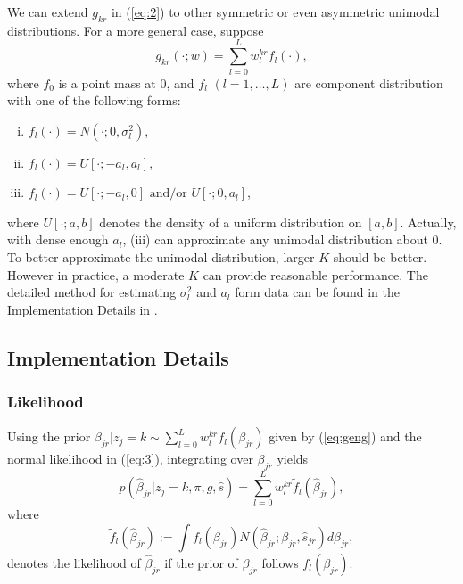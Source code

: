 \documentclass[12pt]{article}
\begin{document}
\vspace{4mm} We can extend $g_{kr}$ in (\ref{eq:2}) to other symmetric or even asymmetric unimodal distributions. For a more general case, suppose
\begin{equation}
g_{kr}(\cdot;w) = \sum_{l=0}^L w_l^{kr}f_l(\cdot),
\label{eq:geng}
\end{equation}
where $f_0$ is a point mass at 0, and $f_l$ $(l=1,\ldots,L)$ are component distribution with one of the following forms:
\begin{enumerate}[(i)]
\item $f_l(\cdot) = N(\cdot; 0, \sigma^2_l)$,
\item $f_l(\cdot) = U[\cdot; -a_l,a_l]$,
\item $f_l(\cdot) = U[\cdot; -a_l,0] \text{ and/or } U[\cdot; 0,a_l]$,
\end{enumerate}
where $U[\cdot; a,b]$ denotes the density of a uniform distribution on $[a,b]$. Actually, with dense enough $a_l$, (iii) can approximate any unimodal distribution about 0. To better approximate the unimodal distribution, larger $K$ should be better. However in practice, a moderate $K$ can provide reasonable performance. The detailed method for estimating $\sigma_l^2$ and $a_l$ form data can be found in the Implementation Details in \cite{Stephens2017}. 

\vspace{5mm}
\subsection{Implementation Details} \label{sec:detail}

\vspace{5mm}
\subsubsection{Likelihood}

\vspace{4mm} Using the prior $\beta_{jr}|z_j=k \sim \sum_{l=0}^L w_l^{kr}f_l(\beta_{jr})$ given by (\ref{eq:geng}) and the normal likelihood in (\ref{eq:3}), integrating over $\beta_{jr}$ yields
\begin{equation}
p(\hat\beta_{jr}|z_j=k,\pi,g,\hat s) = \sum_{l=0}^L w_l^{kr}\tilde f_l(\hat\beta_{jr}),
\end{equation}
where
\begin{equation}
     \tilde f_{l}(\hat\beta_{jr}) := \int f_l(\beta_{jr})N(\hat\beta_{jr};\beta_{jr},\hat s_{jr})d\beta_{jr},
\end{equation}
denotes the likelihood of $\hat\beta_{jr}$ if the prior of $\beta_{jr}$ follows $f_l(\beta_{jr})$. 
\end{document}
